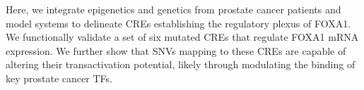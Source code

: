 Here, we integrate epigenetics and genetics from prostate cancer patients and model systems to delineate CREs establishing the regulatory plexus of FOXA1.
We functionally validate a set of six mutated CREs that regulate FOXA1 mRNA expression.
We further show that SNVs mapping to these CREs are capable of altering their transactivation potential, likely through modulating the binding of key prostate cancer TFs.
